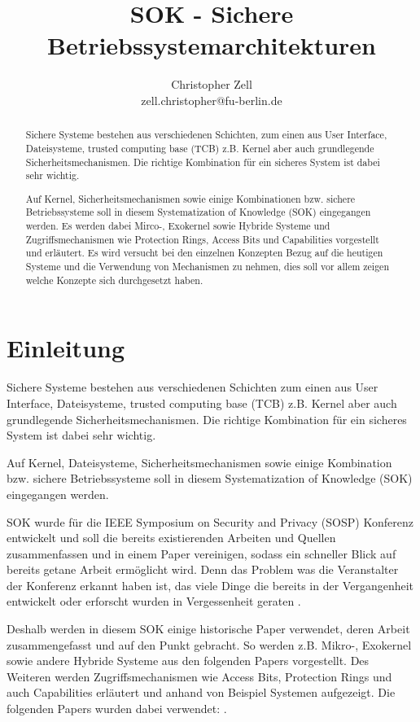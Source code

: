 \documentclass[11pt,technote]{IEEEtran}
\title{SOK - Sichere Betriebssystemarchitekturen}%
\author{Christopher Zell\\
        zell.christopher@fu-berlin.de}
\begin{document}
\maketitle

  \begin{abstract}
    Sichere Systeme bestehen aus verschiedenen Schichten, zum einen aus User Interface, Dateisysteme, trusted computing base (TCB)
    z.B. Kernel aber auch grundlegende Sicherheitsmechanismen. Die richtige Kombination f\"ur ein sicheres System ist dabei sehr wichtig.
    
    Auf Kernel, Sicherheitsmechanismen sowie einige Kombinationen bzw. sichere Betriebssysteme soll in diesem
    Systematization of Knowledge (SOK) eingegangen werden.
    Es werden dabei Mirco-, Exokernel sowie Hybride Systeme und Zugriffsmechanismen
    wie Protection Rings, Access Bits und Capabilities vorgestellt und erl\"autert.
    Es wird versucht bei den einzelnen Konzepten Bezug auf die heutigen Systeme und die Verwendung von Mechanismen zu nehmen,
    dies soll vor allem zeigen welche Konzepte sich durchgesetzt haben.
  \end{abstract}
  
  \section{Einleitung} \label{sec:intro} 
    Sichere Systeme bestehen aus verschiedenen Schichten zum einen aus User Interface, Dateisysteme, trusted computing base (TCB)
    z.B. Kernel aber auch grundlegende Sicherheitsmechanismen. Die richtige Kombination f\"ur ein sicheres System ist dabei sehr wichtig.
    
    Auf Kernel, Dateisysteme, Sicherheitsmechanismen sowie einige Kombination bzw. sichere Betriebssysteme soll in diesem
    Systematization of Knowledge (SOK) eingegangen werden.
    
    SOK wurde f\"ur die IEEE Symposium on Security and Privacy (SOSP) Konferenz
    entwickelt und soll die bereits existierenden Arbeiten und Quellen zusammenfassen
    und in einem Paper vereinigen, sodass ein schneller Blick auf bereits getane
    Arbeit erm\"oglicht wird. Denn das Problem was die Veranstalter der Konferenz
    erkannt haben ist, das viele Dinge die bereits in der Vergangenheit entwickelt oder
    erforscht wurden in Vergessenheit geraten \cite{Url:sok}.
    
    Deshalb werden in diesem SOK einige historische Paper verwendet, deren Arbeit
    zusammengefasst und auf den Punkt gebracht.
    So werden z.B. Mikro-, Exokernel sowie andere Hybride Systeme aus den folgenden Papers 
    \cite{inproc:micro, inproc:exo, inproc:spin, inproc:eros, inproc:asbestos} vorgestellt.
    Des Weiteren werden Zugriffsmechanismen wie Access Bits, Protection Rings und auch Capabilities erl\"autert
    und anhand von Beispiel Systemen aufgezeigt. Die folgenden Papers wurden dabei verwendet:
    \cite{inproc:multics, inproc:protec-rings, inproc:unix, inproc:plan9, inproc:cap}.
    
\end{document}
